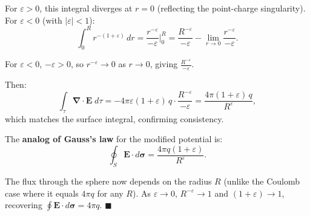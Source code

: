\documentclass[12pt]{article}
\newcommand{\vect}[1]{\mathbf{#1}}
\newcommand{\grad}{\boldsymbol{\nabla}}
\begin{document}
For $\varepsilon > 0$, this integral diverges at $r = 0$ (reflecting the point-charge singularity). For $\varepsilon < 0$ (with $|\varepsilon| < 1$):
\[
\int_0^R r^{-(1+\varepsilon)}\,dr = \frac{r^{-\varepsilon}}{-\varepsilon}\bigg|_0^R = \frac{R^{-\varepsilon}}{-\varepsilon} - \lim_{r\to 0}\frac{r^{-\varepsilon}}{-\varepsilon}.
\]

For $\varepsilon < 0$, $-\varepsilon > 0$, so $r^{-\varepsilon} \to 0$ as $r \to 0$, giving $\frac{R^{-\varepsilon}}{-\varepsilon}$.

Then:
\[
\int_\tau \grad\cdot\vect{E}\;d\tau = -4\pi\varepsilon(1+\varepsilon)\,q \cdot \frac{R^{-\varepsilon}}{-\varepsilon} = \frac{4\pi(1+\varepsilon)\,q}{R^{\varepsilon}},
\]
which matches the surface integral, confirming consistency.

The \textbf{analog of Gauss's law} for the modified potential is:
\[
\boxed{\oint_S \vect{E}\cdot d\boldsymbol{\sigma} = \frac{4\pi q(1+\varepsilon)}{R^{\varepsilon}}}.
\]

The flux through the sphere now depends on the radius $R$ (unlike the Coulomb case where it equals $4\pi q$ for any $R$). As $\varepsilon \to 0$, $R^{-\varepsilon} \to 1$ and $(1+\varepsilon) \to 1$, recovering $\oint \vect{E}\cdot d\boldsymbol{\sigma} = 4\pi q$. \hfill $\blacksquare$
\end{document}
